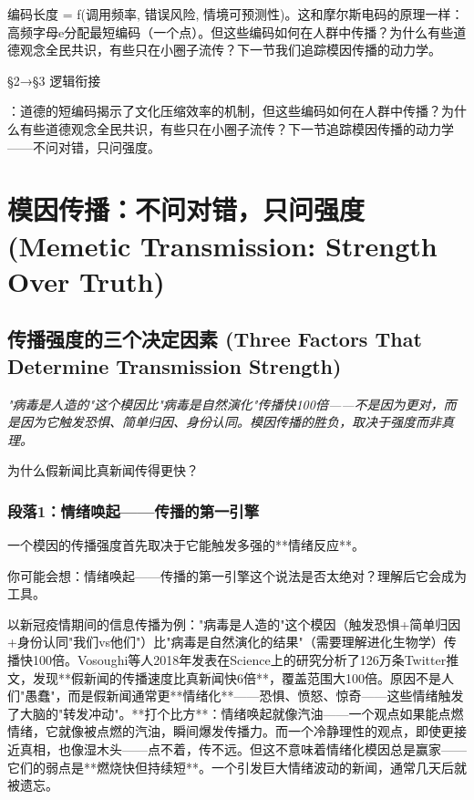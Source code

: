 \documentclass[a4paper,12pt]{book}
\newenvironment{motivation}{\begin{tcolorbox}[colback=gray!10,colframe=gray!60,title=\textit{动机}]\small\itshape}{\end{tcolorbox}}
\newenvironment{questionbox}{\begin{tcolorbox}[colback=red!3,colframe=red!60]}{\end{tcolorbox}}
\begin{document}
\begin{motivation}
\begin{motivation}
\begin{motivation}
{编码长度 = f(调用频率, 错误风险, 情境可预测性)。这和摩尔斯电码的原理一样：高频字母e分配最短编码（一个点）。但这些编码如何在人群中传播？为什么有些道德观念全民共识，有些只在小圈子流传？下一节我们追踪模因传播的动力学。


	§2→§3 逻辑衔接}：道德的短编码揭示了文化压缩效率的机制，但这些编码如何在人群中传播？为什么有些道德观念全民共识，有些只在小圈子流传？下一节追踪模因传播的动力学——不问对错，只问强度。

	\section{模因传播：不问对错，只问强度 (Memetic Transmission: Strength Over Truth)}

	\subsection{传播强度的三个决定因素 (Three Factors That Determine Transmission Strength)}
	\begin{motivation}
		"病毒是人造的"这个模因比"病毒是自然演化"传播快100倍——不是因为更对，而是因为它触发恐惧、简单归因、身份认同。模因传播的胜负，取决于强度而非真理。
	\end{motivation}
	\begin{questionbox}
		为什么假新闻比真新闻传得更快？
	\end{questionbox}

	\subsubsection*{段落1：情绪唤起——传播的第一引擎}
	一个模因的传播强度首先取决于它能触发多强的**情绪反应**。
	\begin{tcolorbox}[colback=yellow!5, title=\textit{读者行为预测}]
		你可能会想：情绪唤起——传播的第一引擎这个说法是否太绝对？理解后它会成为工具。
	\end{tcolorbox}

以新冠疫情期间的信息传播为例："病毒是人造的"这个模因（触发恐惧+简单归因+身份认同"我们vs他们"）比"病毒是自然演化的结果"（需要理解进化生物学）传播快100倍。Vosoughi等人2018年发表在Science上的研究分析了126万条Twitter推文，发现**假新闻的传播速度比真新闻快6倍**，覆盖范围大100倍。原因不是人们"愚蠢"，而是假新闻通常更**情绪化**——恐惧、愤怒、惊奇——这些情绪触发了大脑的"转发冲动"。**打个比方**：情绪唤起就像汽油——一个观点如果能点燃情绪，它就像被点燃的汽油，瞬间爆发传播力。而一个冷静理性的观点，即使更接近真相，也像湿木头——点不着，传不远。但这不意味着情绪化模因总是赢家——它们的弱点是**燃烧快但持续短**。一个引发巨大情绪波动的新闻，通常几天后就被遗忘。


\end{motivation}
\end{motivation}
\end{motivation}
\end{document}
